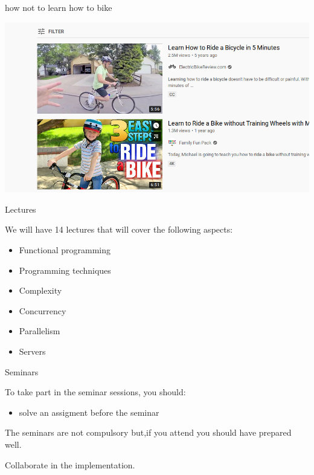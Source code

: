 \begin{frame}{how not to learn how to bike}

  \pause
  \includegraphics[scale=0.6]{learn.png} 

\end{frame}


\begin{frame}{Lectures}

   We will have 14 lectures that will cover the following aspects:


  \begin{itemize}
    \item Functional programming
\pause
    \item Programming techniques
\pause
    \item Complexity 
\pause
    \item Concurrency 
\pause
    \item Parallelism
\pause
    \item Servers
  \end{itemize}
\end{frame}


\begin{frame}{Seminars}

  To take part in the seminar sessions, you should:
  \begin{itemize}
  \item solve an assigment before the seminar 
  \end{itemize}

  \pause \vspace{20pt}
  The seminars are not compulsory but,\pause if you attend you should have prepared well. 

  \pause \vspace{20pt}
  Collaborate in the implementation.

\end{frame}

